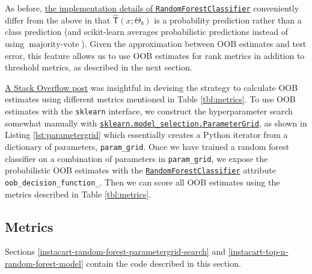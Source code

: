 \documentclass[11pt]{article}
\theoremstyle{definition}
\numberwithin{equation}{section}
\begin{document}
As before,
\href{https://scikit-learn.org/stable/modules/ensemble.html\#random-forests}{the
  implementation details of \texttt{RandomForestClassifier}} conveniently
differ from the above in that \(\hat{\mathsf{T}} (x; \Theta_b)\) is a probability
prediction rather than a class prediction (and scikit-learn averages
probabilistic predictions instead of using
\(\operatorname{majority-vote}\)). Given the approximation between OOB
estimates and test error, this feature allows us to use OOB estimates
for rank metrics in addition to threshold metrics, as described in the
next section.




\href{https://datascience.stackexchange.com/a/30408}{A Stack Overflow
  post} was insightful in devising the strategy to calculate OOB estimates
using different metrics mentioned in Table \ref{tbl:metrics}. To use OOB estimates with the \texttt{sklearn}
interface, we construct the hyperparameter search somewhat manually with
\href{https://scikit-learn.org/stable/modules/generated/sklearn.model_selection.ParameterGrid.html}{\texttt{sklearn.model\_selection.ParameterGrid}},
as shown in Listing \ref{lst:parametergrid}
which essentially creates a Python iterator from a dictionary of
parameters, \texttt{param\_grid}. Once we have trained a random forest
classifier on a combination of parameters in \texttt{param\_grid}, we
expose the probabilistic OOB estimates with the
\href{https://scikit-learn.org/stable/modules/generated/sklearn.ensemble.RandomForestClassifier.html\#sklearn.ensemble.RandomForestClassifier}{\texttt{RandomForestClassifier}}
attribute \texttt{oob\_decision\_function\_}. Then we can score all OOB
estimates using the metrics described in Table \ref{tbl:metrics}.








\hypertarget{metrics}{%
  \subsection{Metrics}\label{metrics}}
Sections \ref{instacart-random-forest-parametergrid-search} and \ref{instacart-top-n-random-forest-model} contain the code described in this section.
\end{document}
